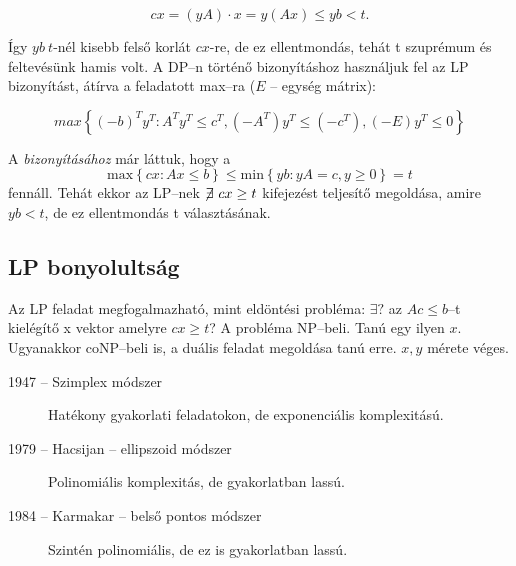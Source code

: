 \[ cx = (yA)\cdot x = y (Ax) \leq yb < t.\]

Így $yb~t$-nél kisebb felső korlát $cx$-re, de ez ellentmondás, tehát t szuprémum és
feltevésünk hamis volt. A DP--n történő bizonyításhoz használjuk fel az LP bizonyítást, 
átírva a feladatott max--ra ($E$ -- egység mátrix):

\[ max \left\{ (-b)^T y^T : A^T y^T \leq c^T, (-A^T) y^T \leq (-c^T),
(-E)y^T \leq 0 \right\} \]
 
A  \emph{bizonyításához} már láttuk, hogy a \[ \mbox{max}\left\{
cx:Ax \leq b \right\} \leq
   \mbox{min}\left\{ yb:yA = c, y \geq 0 \right\}=t
\] fennáll. Tehát ekkor az LP--nek $\not\!\exists~cx \geq t$ kifejezést teljesítő
megoldása, amire $yb<t$, de ez ellentmondás t választásának.

\subsection{LP bonyolultság}

Az LP feladat megfogalmazható, mint eldöntési probléma: $\exists?$ az $Ac \leq
b$--t kielégítő x vektor amelyre $cx\geq t$? A probléma NP--beli. Tanú egy ilyen
$x$. Ugyanakkor coNP--beli is, a duális feladat megoldása tanú erre. $x, y$
mérete véges.

\begin{description}
  \item[1947 -- Szimplex módszer] Hatékony gyakorlati feladatokon, de exponenciális komplexitású.
  \item[1979 --  Hacsijan -- ellipszoid módszer] Polinomiális komplexitás, de gyakorlatban lassú.
  \item[1984 --  Karmakar -- belső pontos módszer] Szintén polinomiális, de ez is gyakorlatban lassú.
\end{description}
